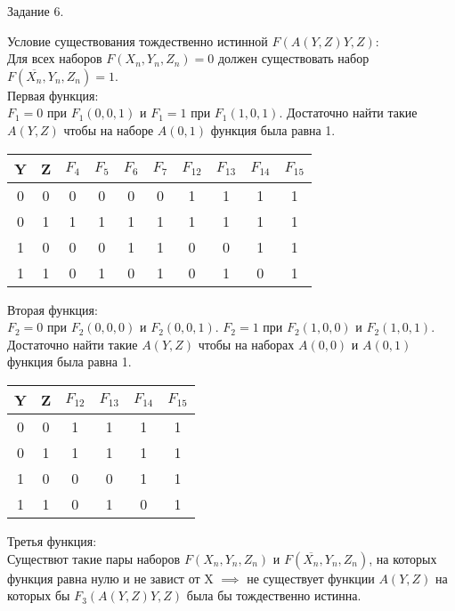 \documentclass[a4paper,12pt]{report} %
\begin{document}
\begin{center}
	Задание 6.\\
\end{center}
\begin{flushleft}

	Условие существования тождественно истинной $F(A(Y,Z)Y,Z)$:\\
	Для всех наборов $F(X_n,Y_n,Z_n) = 0 $ должен существовать набор $F(\overline{X_n},Y_n,Z_n) = 1$.\\
	Первая функция:\\
	$F_1 = 0$ при $F_1(0,0,1)$ и $F_1 = 1$ при $F_1(1,0,1)$. Достаточно найти такие $A(Y,Z)$ чтобы на наборе $A(0,1)$
	функция была равна 1.\\
	\bigskip
	\begin{tabular}{| c | c | c | c | c | c | c | c | c | c |}
	\hline
	Y & Z & $F_4$ & $F_5$ & $F_6$ & $F_7$ & $F_{12}$ & $F_{13}$ & $F_{14}$ & $F_{15}$\\
	\hline
	0 & 0 & 0 & 0 & 0 & 0 & 1 & 1 & 1 & 1\\
	\hline
	0 & 1 & 1 & 1 & 1 & 1 & 1 & 1 & 1 & 1\\
	\hline
	1 & 0 & 0 & 0 & 1 & 1 & 0 & 0 & 1 & 1\\
	\hline
	1 & 1 & 0 & 1 & 0 & 1 & 0 & 1 & 0 & 1\\
	\hline
	\end{tabular}
	\bigskip
	
	Вторая функция:\\
	$F_2 = 0$ при $F_2(0,0,0)$ и $F_2(0,0,1)$. $F_2 = 1$ при $F_2(1,0,0)$ и $F_2(1,0,1)$. Достаточно найти такие
	$A(Y,Z)$ чтобы на наборах $A(0,0)$ и $A(0,1)$ функция была равна 1.\\
	\bigskip
	\begin{tabular}{| c | c | c | c | c | c |}
	\hline
	Y & Z & $F_{12}$ & $F_{13}$ & $F_{14}$ & $F_{15}$\\
	\hline
	0 & 0 & 1 & 1 & 1 & 1\\
	\hline
	0 & 1 & 1 & 1 & 1 & 1\\
	\hline
	1 & 0 & 0 & 0 & 1 & 1\\
	\hline
	1 & 1 & 0 & 1 & 0 & 1\\
	\hline
	\end{tabular}
	\bigskip

	Третья функция:\\
	Существют такие пары наборов $F(X_n,Y_n,Z_n)$ и $F(\overline{X_n},Y_n,Z_n)$, на которых функция равна нулю и не завист от X $\implies$ не существует функции $A(Y,Z)$ на которых бы $F_3(A(Y,Z)Y,Z)$ была бы тождественно истинна.\\
\end{flushleft}
\end{document}
